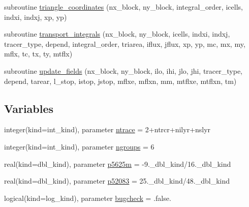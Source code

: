 \begin{DoxyCompactItemize}
\item 
subroutine \hyperlink{namespaceice__transport__remap_a0118e9be4eed6545abe6b6d08ebea458}{triangle\_\-coordinates} (nx\_\-block, ny\_\-block, integral\_\-order, icells, indxi, indxj, xp, yp)
\item 
subroutine \hyperlink{namespaceice__transport__remap_a36c63f1390ec491939f47e64dab35e1e}{transport\_\-integrals} (nx\_\-block, ny\_\-block, icells, indxi, indxj, tracer\_\-type, depend, integral\_\-order, triarea, iflux, jflux, xp, yp, mc, mx, my, mflx, tc, tx, ty, mtflx)
\item 
subroutine \hyperlink{namespaceice__transport__remap_a2f57bc59a0a273bc0c6aff4104b094c0}{update\_\-fields} (nx\_\-block, ny\_\-block, ilo, ihi, jlo, jhi, tracer\_\-type, depend, tarear, l\_\-stop, istop, jstop, mflxe, mflxn, mm, mtflxe, mtflxn, tm)
\end{DoxyCompactItemize}
\subsection*{Variables}
\begin{DoxyCompactItemize}
\item 
integer(kind=int\_\-kind), parameter \hyperlink{namespaceice__transport__remap_a5012cc594b512eddae2a80fd91132217}{ntrace} = 2+ntrcr+nilyr+nslyr
\item 
integer(kind=int\_\-kind), parameter \hyperlink{namespaceice__transport__remap_a66c26988d6a99e211fdc9fd6cb9025c6}{ngroups} = 6
\item 
real(kind=dbl\_\-kind), parameter \hyperlink{namespaceice__transport__remap_a4571153ae2d02f5b5251863d6bdabc37}{p5625m} = -\/9.\_\-dbl\_\-kind/16.\_\-dbl\_\-kind
\item 
real(kind=dbl\_\-kind), parameter \hyperlink{namespaceice__transport__remap_a61fb7fc0ff741aea883e70089a6f0ea8}{p52083} = 25.\_\-dbl\_\-kind/48.\_\-dbl\_\-kind
\item 
logical(kind=log\_\-kind), parameter \hyperlink{namespaceice__transport__remap_a2ea16fe2f40b061e8beaf561ebf7524c}{bugcheck} = .false.
\end{DoxyCompactItemize}


